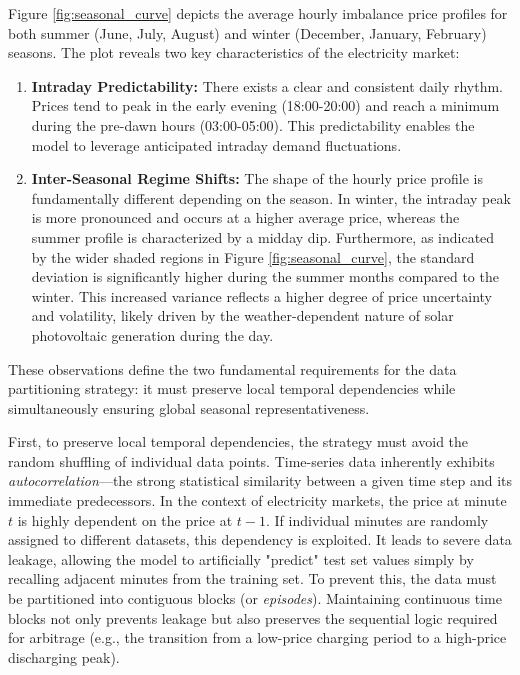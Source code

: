 Figure \ref{fig:seasonal_curve} depicts the average hourly imbalance price profiles for both summer (June, July, August) and winter (December, January, February) seasons. The plot reveals two key characteristics of the electricity market:
\begin{enumerate}
    \item \textbf{Intraday Predictability:} There exists a clear and consistent daily rhythm. Prices tend to peak in the early evening (18:00-20:00) and reach a minimum during the pre-dawn hours (03:00-05:00). This predictability enables the model to leverage anticipated intraday demand fluctuations.
    \item \textbf{Inter-Seasonal Regime Shifts:} The shape of the hourly price profile is fundamentally different depending on the season. In winter, the intraday peak is more pronounced and occurs at a higher average price, whereas the summer profile is characterized by a midday dip. Furthermore, as indicated by the wider shaded regions in Figure \ref{fig:seasonal_curve}, the standard deviation is significantly higher during the summer months compared to the winter. This increased variance reflects a higher degree of price uncertainty and volatility, likely driven by the weather-dependent nature of solar photovoltaic generation during the day.
\end{enumerate}

These observations define the two fundamental requirements for the data partitioning strategy: it must preserve local temporal dependencies while simultaneously ensuring global seasonal representativeness.

First, to preserve local temporal dependencies, the strategy must avoid the random shuffling of individual data points. Time-series data inherently exhibits \textit{autocorrelation}—the strong statistical similarity between a given time step and its immediate predecessors. In the context of electricity markets, the price at minute $t$ is highly dependent on the price at $t-1$. If individual minutes are randomly assigned to different datasets, this dependency is exploited. It leads to severe data leakage, allowing the model to artificially "predict" test set values simply by recalling adjacent minutes from the training set. To prevent this, the data must be partitioned into contiguous blocks (or \textit{episodes}). Maintaining continuous time blocks not only prevents leakage but also preserves the sequential logic required for arbitrage (e.g., the transition from a low-price charging period to a high-price discharging peak).

